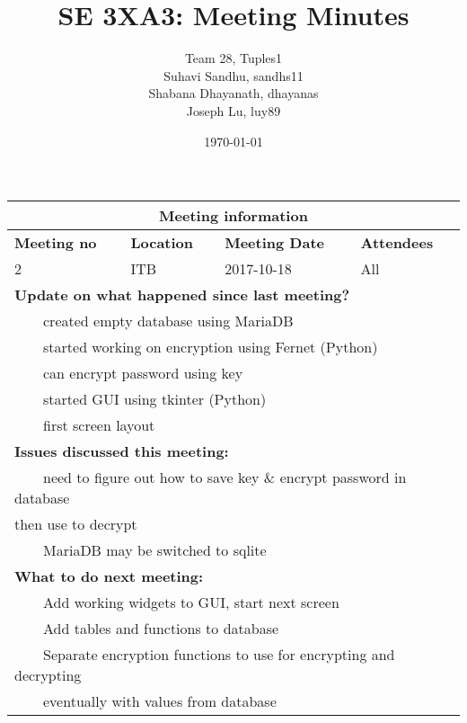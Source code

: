 \documentclass{article}
\title{SE 3XA3: Meeting Minutes}
\author{Team 28, Tuples1
		\\ Suhavi Sandhu, sandhs11
		\\ Shabana Dhayanath, dhayanas
		\\ Joseph Lu, luy89
}
\date{\today}
\newcommand{\tabitem}{~~\llap{\textbullet}~~}
\begin{document}
\begin{tabularx}{\textwidth}{| X || X || X || X |}
    \hline
    \hline
    \multicolumn{4}{|c|}{\textbf{Meeting information}}\\
    \hline
    \hline
        
    \textbf{Meeting no}& \textbf{Location}&\textbf{Meeting Date}&\textbf{Attendees}\\
    
    \hline

    2 & ITB & 2017-10-18 & All\\
    
    \hline

    \multicolumn{4}{|l|}{\textbf{Update on what happened since last meeting?}}\\

    \multicolumn{4}{|l|}{\tabitem created empty database using MariaDB}\\
    \multicolumn{4}{|l|}{\tabitem started working on encryption using Fernet (Python)}\\
        \multicolumn{4}{|l|}{\quad\tabitem can encrypt password using key}\\
    \multicolumn{4}{|l|}{\tabitem started GUI using tkinter (Python)}\\
        \multicolumn{4}{|l|}{\quad\tabitem first screen layout}\\

    \hline

    \multicolumn{4}{|l|}{\textbf{Issues discussed this meeting:}}\\
    
    \multicolumn{4}{|l|}{\tabitem need to figure out how to save key \& encrypt password in database}\\
    \multicolumn{4}{|l|}{then use to decrypt}\\
    \multicolumn{4}{|l|}{\tabitem MariaDB may be switched to sqlite}\\

    \hline

    \multicolumn{4}{|l|}{\textbf{What to do next meeting:}}\\

    \multicolumn{4}{|l|}{\tabitem Add working widgets to GUI, start next screen}\\
    \multicolumn{4}{|l|}{\tabitem Add tables and functions to database}\\
    \multicolumn{4}{|l|}{\tabitem Separate encryption functions to use for encrypting and decrypting}\\
        \multicolumn{4}{|l|}{\quad\tabitem eventually with values from database}\\


\end{tabularx}
\end{document}
